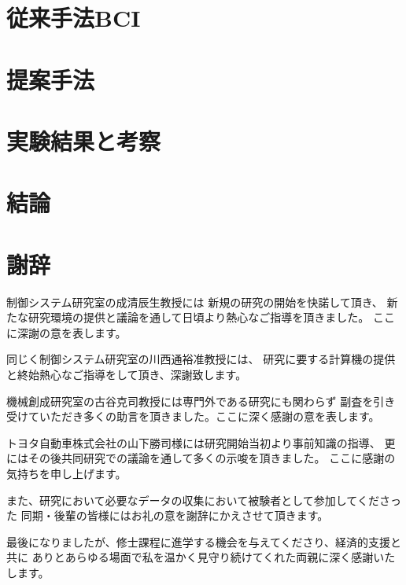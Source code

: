\documentclass[a4j,12pt, oneside, openany, report]{jsbook}
\begin{document}
\chapter{{\mc 従来手法}{\rm BCI}}



\chapter{\mc 提案手法}


% 
% 

\chapter{\mc 実験結果と考察}

% 


\chapter{\mc 結論}


%
\chapter*{謝辞}
制御システム研究室の成清辰生教授には
新規の研究の開始を快諾して頂き、
新たな研究環境の提供と議論を通して日頃より熱心なご指導を頂きました。
ここに深謝の意を表します。

同じく制御システム研究室の川西通裕准教授には、
研究に要する計算機の提供と終始熱心なご指導をして頂き、深謝致します。

機械創成研究室の古谷克司教授には専門外である研究にも関わらず
副査を引き受けていただき多くの助言を頂きました。ここに深く感謝の意を表します。

トヨタ自動車株式会社の山下勝司様には研究開始当初より事前知識の指導、
更にはその後共同研究での議論を通して多くの示唆を頂きました。
ここに感謝の気持ちを申し上げます。

また、研究において必要なデータの収集において被験者として参加してくださった
同期・後輩の皆様にはお礼の意を謝辞にかえさせて頂きます。

最後になりましたが、修士課程に進学する機会を与えてくださり、経済的支援と共に
ありとあらゆる場面で私を温かく見守り続けてくれた両親に深く感謝いたします。


%

% 


%
% 
%
%
\newpage
\printindex
%
%
\end{document}
